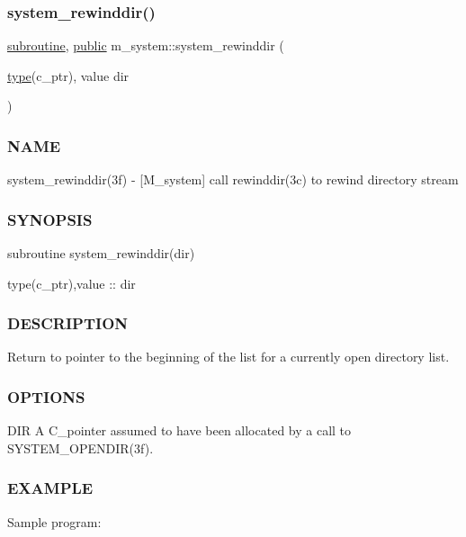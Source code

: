 \subsubsection{\texorpdfstring{system\+\_\+rewinddir()}{system\_rewinddir()}}
{\footnotesize\ttfamily \hyperlink{M__stopwatch_83_8txt_acfbcff50169d691ff02d4a123ed70482}{subroutine}, \hyperlink{M__stopwatch_83_8txt_a2f74811300c361e53b430611a7d1769f}{public} m\+\_\+system\+::system\+\_\+rewinddir (\begin{DoxyParamCaption}\item[{\hyperlink{stop__watch_83_8txt_a70f0ead91c32e25323c03265aa302c1c}{type}(c\+\_\+ptr), value}]{dir }\end{DoxyParamCaption})}



\subsubsection*{N\+A\+ME}

system\+\_\+rewinddir(3f) -\/ \mbox{[}M\+\_\+system\mbox{]} call rewinddir(3c) to rewind directory stream \subsubsection*{S\+Y\+N\+O\+P\+S\+IS}

subroutine system\+\_\+rewinddir(dir)

type(c\+\_\+ptr),value \+:\+: dir

\subsubsection*{D\+E\+S\+C\+R\+I\+P\+T\+I\+ON}

Return to pointer to the beginning of the list for a currently open directory list.

\subsubsection*{O\+P\+T\+I\+O\+NS}

D\+IR A C\+\_\+pointer assumed to have been allocated by a call to S\+Y\+S\+T\+E\+M\+\_\+\+O\+P\+E\+N\+D\+I\+R(3f).

\subsubsection*{E\+X\+A\+M\+P\+LE}

Sample program\+:

